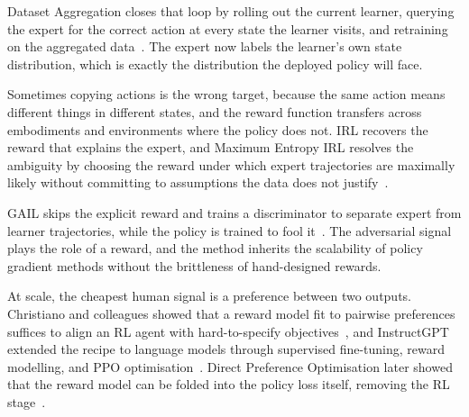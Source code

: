 
Dataset Aggregation closes that loop by rolling out the current learner,
querying the expert for the correct action at every state the learner visits,
and retraining on the aggregated data~\cite{Ross2011DAgger}.
The expert now labels the learner's own state distribution,
which is exactly the distribution the deployed policy will face.

Sometimes copying actions is the wrong target, because the same action means different things
in different states, and the reward function transfers across embodiments and environments where the policy does not.
IRL recovers the reward that explains the expert, and Maximum Entropy IRL resolves the ambiguity
by choosing the reward under which expert trajectories are maximally likely
without committing to assumptions the data does not justify~\cite{Ziebart2008MaxEntIRL}.

GAIL skips the explicit reward and trains a discriminator to separate expert from learner trajectories,
while the policy is trained to fool it~\cite{Ho2016GAIL}.
The adversarial signal plays the role of a reward,
and the method inherits the scalability of policy gradient methods without the brittleness of hand-designed rewards.


At scale, the cheapest human signal is a preference between two outputs.
Christiano and colleagues showed that a reward model fit to pairwise preferences
suffices to align an RL agent with hard-to-specify objectives~\cite{Christiano2017Preferences},
and InstructGPT extended the recipe to language models through supervised fine-tuning,
reward modelling, and PPO optimisation~\cite{Ouyang2022InstructGPT}.
Direct Preference Optimisation later showed that the reward model can be folded into the policy loss itself,
removing the RL stage~\cite{Rafailov2023DPO}.

